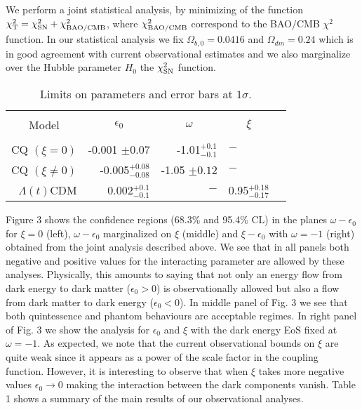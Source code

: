 \documentclass[twocolumn,preprintnumbers,amsmath,amssymb]{revtex4}
\begin{document}
We perform a joint statistical analysis, by minimizing of the function $\chi^2_{\rm{T}} = \chi^2_{\rm{SN}} + \chi^2_{\rm{BAO/CMB}}$, where $\chi^2_{\rm{BAO/CMB}}$ correspond to the BAO/CMB $\chi^2$ function. In our statistical analysis we fix $\Omega_{b,0} = 0.0416$ and $\Omega_{dm} = 0.24$ which is in good agreement with current observational estimates and we also marginalize over the Hubble parameter $H_0$ the $\chi^2_{\rm{SN}}$ function.

\begin{table}[t]  
\begin{center}  
\caption{Limits on parameters and error bars at $1\sigma$.}
\begin{tabular}{rrrll}  
\hline  \hline \\
\multicolumn{1}{c}{Model}&
\multicolumn{1}{c}{\quad $\epsilon_{0}$}&
\multicolumn{1}{c}{ \quad $\omega $}& 
\multicolumn{1}{c}{$\xi$}\\ \hline \\
CQ $(\xi = 0)$ &-0.001 $\pm 0.07$& -1.01$ ^{+0.1}_{-0.1}$ \quad &  \quad \quad $-$\\ 
CQ  $(\xi \neq 0)$  & -0.005$^{+0.08}_{-0.08}$ & -1.05 $\pm 0.12$ & \quad \quad $-$\\
$\Lambda(t)$CDM & 0.002$^{+0.1}_{-0.1}$ &$-$ \quad \quad & 0.95$^{+0.18}_{-0.17}$\\ 
\hline  \hline
\end{tabular} 
\end{center} 
\end{table} 

Figure 3 shows the confidence regions (68.3\% and 95.4\% CL) in the planes $\omega - \epsilon_0$ for $\xi = 0$ (left), $\omega - \epsilon_0$ marginalized on $\xi$ (middle) and $\xi - \epsilon_0$ with $\omega = -1$ (right) obtained from the joint analysis described above. We see that in all panels both negative and positive values for the interacting parameter are allowed by these analyses. Physically, this amounts to saying that not only an energy flow from dark energy to dark matter ($\epsilon_{0} > 0$) is observationally allowed but also a flow from dark matter to dark energy ($\epsilon_{0} < 0$). In middle panel of Fig. 3 we see that both quintessence and phantom behaviours 
are acceptable regimes. In right panel of Fig. 3 we show the analysis for $\epsilon_{0}$ and $\xi$ with the dark energy EoS fixed at $\omega = -1$. As expected, we note that the current observational bounds on $\xi$ are quite weak since it appears as a power of the scale factor in the coupling function. However, it is interesting to observe that when $\xi$ takes more negative values $\epsilon_0 \rightarrow 0$ making the interaction between the dark components vanish. Table 1 shows a summary of the main results of our observational analyses.
\end{document}
